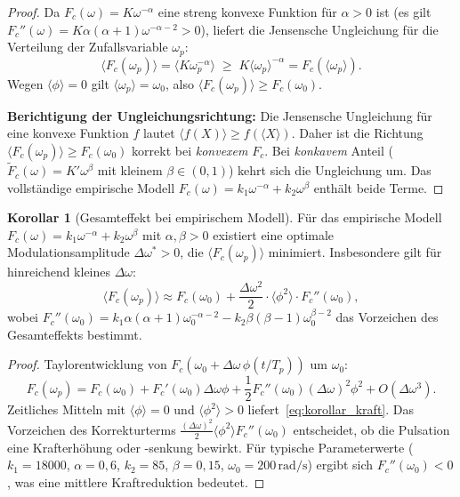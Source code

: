 ﻿\documentclass[a4paper,12pt]{article}
\theoremstyle{definition}
\newtheorem{korollar}{Korollar}
\begin{document}
\begin{proof}
Da $F_c(\omega) = K\omega^{-\alpha}$ eine streng konvexe Funktion für $\alpha > 0$ ist
(es gilt $F_c''(\omega) = K\alpha(\alpha+1)\omega^{-\alpha-2} > 0$), liefert die
Jensensche Ungleichung für die Verteilung der Zufallsvariable $\omega_p$:
\[
\langle F_c(\omega_p) \rangle = \langle K\omega_p^{-\alpha} \rangle \;\geq\; K \langle\omega_p\rangle^{-\alpha} = F_c(\langle\omega_p\rangle).
\]
Wegen $\langle\phi\rangle = 0$ gilt $\langle\omega_p\rangle = \omega_0$, also
$\langle F_c(\omega_p) \rangle \geq F_c(\omega_0)$.

\textbf{Berichtigung der Ungleichungsrichtung:} Die Jensensche Ungleichung für
eine konvexe Funktion $f$ lautet $\langle f(X) \rangle \geq f(\langle X \rangle)$.
Daher ist die Richtung $\langle F_c(\omega_p)\rangle \geq F_c(\omega_0)$ korrekt
bei \emph{konvexem} $F_c$. Bei \emph{konkavem} Anteil ($\tilde{F}_c(\omega) = K'\omega^{\beta}$
mit kleinem $\beta \in (0,1)$) kehrt sich die Ungleichung um. Das vollständige
empirische Modell $F_c(\omega) = k_1\omega^{-\alpha} + k_2\omega^{\beta}$ enthält beide Terme.
\end{proof}

\begin{korollar}[Gesamteffekt bei empirischem Modell]
\label{kor:gesamt}
Für das empirische Modell $F_c(\omega) = k_1\omega^{-\alpha} + k_2\omega^{\beta}$
mit $\alpha, \beta > 0$ existiert eine optimale Modulationsamplitude
$\Delta\omega^* > 0$, die $\langle F_c(\omega_p)\rangle$ minimiert. Insbesondere gilt
für hinreichend kleines $\Delta\omega$:
\begin{equation}
\label{eq:korollar_kraft}
\langle F_c(\omega_p)\rangle \approx F_c(\omega_0) + \frac{\Delta\omega^2}{2} \cdot \langle\phi^2\rangle \cdot F_c''(\omega_0),
\end{equation}
wobei $F_c''(\omega_0) = k_1\alpha(\alpha+1)\omega_0^{-\alpha-2} - k_2\beta(\beta-1)\omega_0^{\beta-2}$
das Vorzeichen des Gesamteffekts bestimmt.
\end{korollar}

\begin{proof}
Taylorentwicklung von $F_c(\omega_0 + \Delta\omega\,\phi(t/T_p))$ um $\omega_0$:
\[
F_c(\omega_p) = F_c(\omega_0) + F_c'(\omega_0)\Delta\omega\phi + \frac{1}{2}F_c''(\omega_0)(\Delta\omega)^2\phi^2 + O(\Delta\omega^3).
\]
Zeitliches Mitteln mit $\langle\phi\rangle = 0$ und $\langle\phi^2\rangle > 0$ liefert~\eqref{eq:korollar_kraft}.
Das Vorzeichen des Korrekturterms $\frac{(\Delta\omega)^2}{2}\langle\phi^2\rangle F_c''(\omega_0)$
entscheidet, ob die Pulsation eine Krafterhöhung oder -senkung bewirkt. Für typische Parameterwerte
($k_1 = 18000$, $\alpha = 0{,}6$, $k_2 = 85$, $\beta = 0{,}15$, $\omega_0 = 200\,\mathrm{rad/s}$)
ergibt sich $F_c''(\omega_0) < 0$, was eine mittlere Kraftreduktion bedeutet.
\end{proof}
\end{document}
